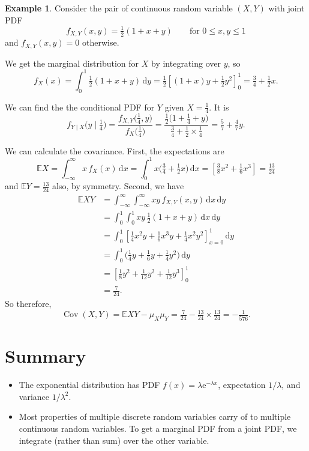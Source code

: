 \documentclass[
  a4paper,
]{book}
\providecommand{\tightlist}{%
  \setlength{\itemsep}{0pt}\setlength{\parskip}{0pt}}
\theoremstyle{definition}
\theoremstyle{definition}
\newtheorem{example}{Example}[chapter]
\theoremstyle{definition}
\theoremstyle{definition}
\theoremstyle{remark}
\begin{document}
\begin{example}
Consider the pair of continuous random variable \((X,Y)\) with joint PDF
\[ f_{X,Y}(x,y) = \tfrac12(1 + x + y) \qquad \text{for $0 \leq x,y\leq 1$} \]
and \(f_{X,Y}(x,y) = 0\) otherwise.

We get the marginal distribution for \(X\) by integrating over \(y\), so
\[ f_X(x) = \int_0^1 \tfrac12(1 + x + y) \, \mathrm dy = \tfrac12 \left[(1 + x)y + \tfrac12y^2\right]_0^1 = \tfrac34 + \tfrac12x . \]

We can find the the conditional PDF for \(Y\) given \(X = \tfrac14\). It is
\[ f_{Y\mid X}\big(y \mid \tfrac14\big) = \frac{f_{X,Y}\big(\tfrac14,y\big)}{f_X\big(\tfrac14\big)}
    = \frac{\tfrac12\big(1 + \tfrac14 + y\big)}{\tfrac34 + \tfrac12\times\tfrac14 } = \tfrac{5}{7} + \tfrac47 y . \]

We can calculate the covariance. First, the expectations are
\[ \mathbb EX = \int_{-\infty}^\infty x\, f_X(x) \,\mathrm dx = \int_0^1 x\big(\tfrac34 + \tfrac12x\big)\, \mathrm dx = \left[\tfrac38 x^2 + \tfrac16 x^3 \right] = \tfrac{13}{24} \]
and \(\mathbb EY = \frac{13}{24}\) also, by symmetry. Second, we have
\begin{align*}
\mathbb EXY
&= \int_{-\infty}^\infty \int_{-\infty}^\infty xy\, f_{X,Y}(x,y) \, \mathrm dx\, \mathrm dy \\
&= \int_0^1 \int_0^1 xy \, \tfrac12(1 + x + y)\, \mathrm dx\, \mathrm dy \\
&= \int_0^1 \left[ \tfrac14 x^2y + \tfrac16 x^3y + \tfrac14 x^2y^2  \right]_{x=0}^1 \, \mathrm dy\\
&= \int_0^1 \big( \tfrac14 y + \tfrac16 y + \tfrac14 y^2 \big) \, \mathrm dy\\
&= \left[ \tfrac18 y^2 + \tfrac{1}{12}y^2 + \tfrac{1}{12}y^3  \right]_0^1 \\
&= \tfrac{7}{24} .
\end{align*}
So therefore,
\[ \operatorname{Cov}(X,Y) = \mathbb EXY - \mu_X \mu_Y = \tfrac{7}{24} - \tfrac{13}{24} \times \tfrac{13}{24} = -\tfrac{1}{576} . \]
\end{example}

\hypertarget{summary-L17}{%
\section*{Summary}\label{summary-L17}}

\begin{itemize}
\tightlist
\item
  The exponential distribution has PDF \(f(x) = \lambda \mathrm e^{-\lambda x}\), expectation \(1/\lambda\), and variance \(1/\lambda^2\).
\item
  Most properties of multiple discrete random variables carry of to multiple continuous random variables. To get a marginal PDF from a joint PDF, we integrate (rather than sum) over the other variable.
\end{itemize}
\end{document}
